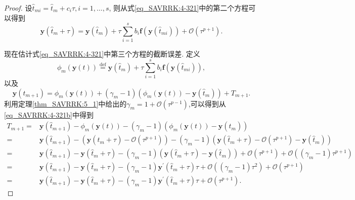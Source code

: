 \begin{proof}
设$\hat{t}_{m i}=\hat{t}_m+c_i\tau, i=1, \ldots, s$,
则从式\eqref{eq_SAVRRK:4-321}中的第二个方程可以得到
\begin{equation}\label{eq_SAVRRK:4-321b}
\bm{y}\left(\hat{t}_m+\tau\right)=\bm{y}\left(\hat{t}_m\right)+\tau \sum_{i=1}^s b_i \bm{f}\left(\bm{y}\left(\hat{t}_{m i}\right)\right)+\mathcal{O}\left(\tau^{p+1}\right).
\end{equation}

现在估计式\eqref{eq_SAVRRK:4-321}中第三个方程的截断误差.
定义
$$\phi_m(\bm{y}(t))\overset{\text{def}}{=}\bm{y}\left(\hat{t}_m\right)+\tau \sum\limits_{i=1}^s b_i \bm{f}\left(\bm{y}\left(\hat{t}_{m i}\right)\right),$$
以及
\begin{equation}
\bm{y}\left(\hat{t}_{m+1}\right)=\phi_m(\bm{y}(t))+\left(\gamma_m-1\right)\left(\phi_m(\bm{y}(t))-\bm{y}\left(\hat{t}_m\right)\right)+T_{m+1}.
\end{equation}
利用定理\ref{thm_SAVRRK:5_1}中给出的$\gamma_m=1+\mathcal{O}\left(\tau^{p-1}\right)$,可以得到从\eqref{eq_SAVRRK:4-321b}中得到
\begin{equation}
\begin{aligned}
T_{m+1}= & \bm{y}\left(\hat{t}_{m+1}\right)\!-\!\phi_m(\bm{y}(t))\!-\!\left(\gamma_m-1\right)\left(\phi_m(\bm{y}(t))\!-\!\bm{y}\left(\hat{t}_m\right)\right) \\
= & \bm{y}\left(\hat{t}_{m+1}\right)\!-\!\left(\bm{y}\left(\hat{t}_m\!+\!\tau\right)\!-\!\mathcal{O}(\tau^{p+1})\right)\!-\!\left(\gamma_m-1\right)\left(\bm{y}\left(\hat{t}_m+\tau\right)\!-\!\mathcal{O}(\tau^{p+1})\!-\!\bm{y}\left(\hat{t}_m\right)\right) \\
= & \bm{y}\left(\hat{t}_{m+1}\right)\!-\!\bm{y}\left(\hat{t}_m\!+\!\tau\right)\!-\!\left(\gamma_m-1\right)\left(\bm{y}\left(\hat{t}_m+\tau\right)\!-\!\bm{y}\left(\hat{t}_m\right)\right)\!+\!\mathcal{O}(\tau^{p+1})\!+\!\mathcal{O}((\gamma_m-1) \tau^{p+1}) \\
= & \bm{y}\left(\hat{t}_{m+1}\right)\!-\!\bm{y}\left(\hat{t}_m\!+\!\tau\right)\!-\!\left(\gamma_m-1\right) \bm{y}^{\prime}\left(\hat{t}_m+\tau\right) \tau\!+\!\mathcal{O}((\gamma_m-1) \tau^2)\!+\!\mathcal{O}(\tau^{p+1}) \\
= & \bm{y}\left(\hat{t}_{m+1}\right)\!-\!\bm{y}\left(\hat{t}_m\!+\!\tau\right)\!-\!\left(\gamma_m-1\right) \bm{y}^{\prime}\left(\hat{t}_m+\tau\right) \tau\!+\!\mathcal{O}(\tau^{p+1}).
\end{aligned}
\end{equation}


\end{proof}
